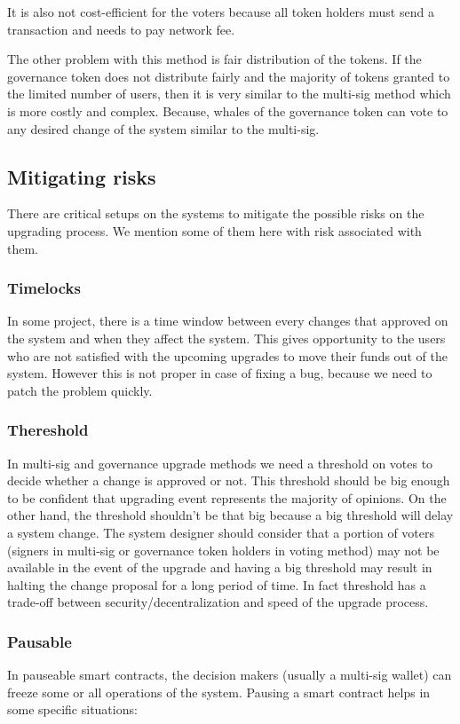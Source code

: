 It is also not cost-efficient for the voters because all token holders must send a transaction and needs to pay network fee.

The other problem with this method is fair distribution of the tokens. If the governance token does not distribute fairly and the majority of tokens granted to the limited number of users, then it is very similar to the multi-sig method which is more costly and complex. Because, whales of the governance token can vote to any desired change of the system similar to the multi-sig.
 

\subsection{Mitigating risks}
There are critical setups on the systems to mitigate the possible risks on the upgrading process. We mention some of them here with risk associated with them.

\subsubsection{Timelocks}
In some project, there is a time window between every changes that approved on the system and when they affect the system. This gives opportunity to the users who are not satisfied with the upcoming upgrades to move their funds out of the system. However this is not proper in case of fixing a bug, because we need to patch the problem quickly.

\subsubsection{Thereshold}
In multi-sig and governance upgrade methods we need a threshold on votes to decide whether a change is approved or not. This threshold should be big enough to be confident that upgrading event represents the majority of opinions. On the other hand, the threshold shouldn't be that big because a big threshold will delay a system change. The system designer should consider that a portion of voters (signers in multi-sig or governance token holders in voting method) may not be available in the event of the upgrade and having a big threshold may result in halting the change proposal for a long period of time. In fact threshold has a trade-off between security/decentralization and speed of the upgrade process.

\subsubsection{Pausable}
In pauseable smart contracts, the decision makers (usually a multi-sig wallet) can freeze some or all operations of the system. Pausing a smart contract helps in some specific situations:

